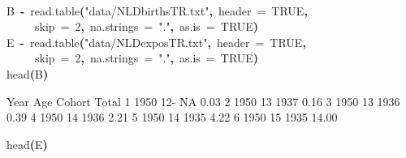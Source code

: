 \documentclass[a4paper]{article}
\newcommand{\hlnumber}[1]{\textcolor[rgb]{0.0823529411764706,0.0784313725490196,0.709803921568627}{#1}}%
\newcommand{\hlfunctioncall}[1]{\textcolor[rgb]{1,0,0}{#1}}%
\newcommand{\hlstring}[1]{\textcolor[rgb]{0.6,0.6,1}{#1}}%
\newcommand{\hlkeyword}[1]{\textcolor[rgb]{0,0,0}{\textbf{#1}}}%
\newcommand{\hlargument}[1]{\textcolor[rgb]{0.694117647058824,0.247058823529412,0.0196078431372549}{#1}}%
\newcommand{\hlassignement}[1]{\textcolor[rgb]{0.215686274509804,0.215686274509804,0.384313725490196}{\textbf{#1}}}%
\newcommand{\hlsymbol}[1]{\textcolor[rgb]{0,0,0}{#1}}%
\newcommand{\hlprompt}[1]{\textcolor[rgb]{0,0,0}{#1}}%
\newcommand{\hlstd}[1]{\textcolor[rgb]{0,0,0}{#1}}%
\newenvironment{Houtput}{\raggedright}{%
%
}
\renewenvironment{Schunk}{\vspace{\topsep}}{\vspace{\topsep}}
\begin{document}
\begin{Houtput}
\hspace*{\fill}\\
\hlstd{}\ttfamily\noindent
\hlprompt{\usebox{\hlnormalsizeboxgreaterthan}{\ }}\hlsymbol{B}{\ }\hlassignement{\usebox{\hlnormalsizeboxlessthan}-}{\ }\hlfunctioncall{read.table}\hlkeyword{(}\hlstring{"data/NLDbirthsTR.txt"}\hlkeyword{,}{\ }\hlargument{header}{\ }\hlargument{=}{\ }\hlnumber{TRUE}\hlkeyword{,}\hspace*{\fill}\\
\hlstd{}\hlprompt{{\ }}{\ }{\ }{\ }{\ }\hlargument{skip}{\ }\hlargument{=}{\ }\hlnumber{2}\hlkeyword{,}{\ }\hlargument{na.strings}{\ }\hlargument{=}{\ }\hlstring{"."}\hlkeyword{,}{\ }\hlargument{as.is}{\ }\hlargument{=}{\ }\hlnumber{TRUE}\hlkeyword{)}\mbox{}
\normalfont
\hspace*{\fill}\\
\hlstd{}\ttfamily\noindent
\hlprompt{\usebox{\hlnormalsizeboxgreaterthan}{\ }}\hlsymbol{E}{\ }\hlassignement{\usebox{\hlnormalsizeboxlessthan}-}{\ }\hlfunctioncall{read.table}\hlkeyword{(}\hlstring{"data/NLDexposTR.txt"}\hlkeyword{,}{\ }\hlargument{header}{\ }\hlargument{=}{\ }\hlnumber{TRUE}\hlkeyword{,}\hspace*{\fill}\\
\hlstd{}\hlprompt{{\ }}{\ }{\ }{\ }{\ }\hlargument{skip}{\ }\hlargument{=}{\ }\hlnumber{2}\hlkeyword{,}{\ }\hlargument{na.strings}{\ }\hlargument{=}{\ }\hlstring{"."}\hlkeyword{,}{\ }\hlargument{as.is}{\ }\hlargument{=}{\ }\hlnumber{TRUE}\hlkeyword{)}\mbox{}
\normalfont
\hspace*{\fill}\\
\hlstd{}\ttfamily\noindent
\hlprompt{\usebox{\hlnormalsizeboxgreaterthan}{\ }}\hlfunctioncall{head}\hlkeyword{(}\hlsymbol{B}\hlkeyword{)}\mbox{}
\normalfont
\hspace*{\fill}\\
\hlstd{}\begin{Schunk}
\begin{Soutput}
  Year Age Cohort Total
1 1950 12-     NA  0.03
2 1950  13   1937  0.16
3 1950  13   1936  0.39
4 1950  14   1936  2.21
5 1950  14   1935  4.22
6 1950  15   1935 14.00
\end{Soutput}
\ttfamily\noindent
\hlprompt{\usebox{\hlnormalsizeboxgreaterthan}{\ }}\hlfunctioncall{head}\hlkeyword{(}\hlsymbol{E}\hlkeyword{)}\mbox{}
\normalfont
\hspace*{\fill}\\
\hlstd{}\begin{Soutput}

\end{Soutput}
\end{Schunk}
\end{Houtput}
\end{document}
